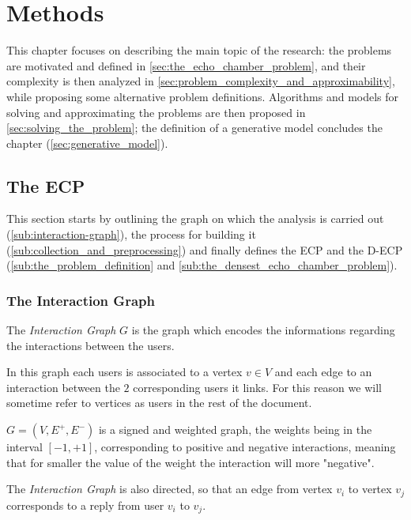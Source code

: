 \chapter{Methods}
\label{ch:methods}

This chapter focuses on describing the main topic of the
research: the problems are motivated and defined in
\autoref{sec:the_echo_chamber_problem}, and their complexity is then analyzed
in \autoref{sec:problem_complexity_and_approximability}, while proposing some
alternative problem definitions. Algorithms and models for solving and
approximating the problems are then proposed in
\autoref{sec:solving_the_problem}; the definition of a generative model
concludes the chapter (\autoref{sec:generative_model}).

\section{The \acrlong{ECP}}%
\label{sec:the_echo_chamber_problem}

This section starts by outlining the graph on which the analysis is carried
out (\autoref{sub:interaction-graph}), the process for building it
(\autoref{sub:collection_and_preprocessing}) and finally defines the
\acrlong{ECP} and the \acrlong{D-ECP} (\autoref{sub:the_problem_definition} and
\autoref{sub:the_densest_echo_chamber_problem}).

\subsection{The Interaction Graph}
\label{sub:interaction-graph}

The \emph{Interaction Graph} $G$ is the graph which encodes the informations
regarding the interactions between the users.

In this graph each users is associated to a vertex $v \in V$ and each edge to
an interaction between the $2$ corresponding users it links. For this reason we
will sometime refer to vertices as users in the rest of the document.

$G = (V, E^{+}, E^{-})  $ is a
signed and weighted graph, the weights being in the interval $[-1, +1]$,
corresponding to positive and negative interactions, meaning that for smaller
the value of the weight the interaction will more "negative".

The \emph{Interaction Graph} is also directed, so that an edge from vertex $v_{i}
$ to vertex $v_{j} $ corresponds to a reply from user $v_{i} $ to $v_{j} $.

